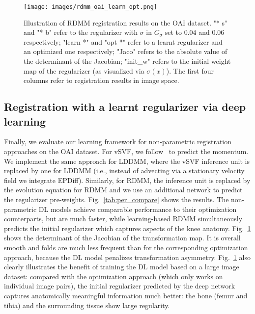 \documentclass{article}
\numberwithin{equation}{section}
\newcommand{\ie}{{i.e.}}
\begin{document}
\begin{figure}[!t]
  \begin{center}
    \texttt{[image: images/rdmm\_oai\_learn\_opt.png]}
  \end{center}
  \caption{\label{fig:oai_img}Illustration of RDMM registration results on the OAI dataset. "* s" and "* b" refer to the regularizer with $\sigma$ in $G_\sigma$ set to $0.04$ and $0.06$ respectively; "learn *" and "opt *" refer to a learnt regularizer and an optimized one respectively; "Jaco" refers to the absolute value of the determinant of the Jacobian; "init\_w" refers to the initial weight map of the regularizer (as visualized via $\sigma(x)$). The first four columns refer to registration results in image space.\vspace{-0.5cm}}\end{figure}


\subsection{Registration with a learnt regularizer via deep learning}
\label{subsec:rdmm_deep_learning}

Finally, we evaluate our learning framework for non-parametric registration approaches on the OAI dataset. For vSVF, we follow~\citep{shen2019networks} to predict the momentum. We implement the same approach for LDDMM, where the vSVF inference unit is replaced by one for LDDMM (\ie, instead of advecting via a stationary velocity field we integrate EPDiff). Similarly, for RDMM, the inference unit is replaced by the evolution equation for RDMM and we use an additional network to predict the regularizer pre-weights. Fig.~\ref{tab:per_compare} shows the results. The non-parametric DL models achieve comparable performance to their optimization counterparts, but are much faster, while learning-based RDMM simultaneously predicts the initial regularizer which captures aspects of the knee anatomy. Fig.~\ref{fig:oai_img} shows the determinant of the Jacobian of the transformation map. It is overall smooth and folds are much less frequent than for the corresponding optimization approach, because the DL model penalizes transformation asymmetry. Fig.~\ref{fig:oai_img} also clearly illustrates the benefit of training the DL model based on a large image dataset: compared with the optimization approach (which only works on individual image pairs), the initial regularizer predicted by the deep network captures anatomically meaningful information much better: the bone (femur and tibia) and the surrounding tissue show large regularity.
\end{document}
